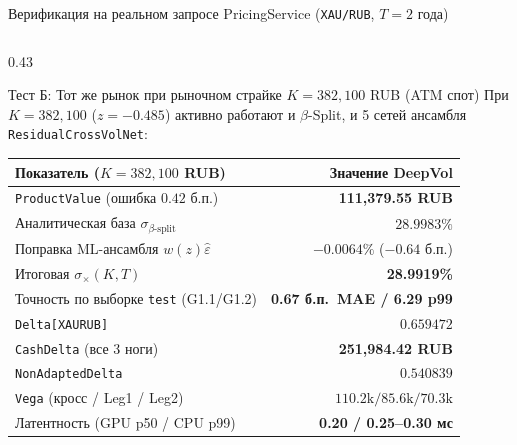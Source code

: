 \documentclass[aspectratio=169, 9pt]{beamer}
\begin{document}
\begin{frame}{Верификация на реальном запросе PricingService (\texttt{XAU/RUB}, $T = 2$ года)}
\begin{columns}[T]
    \begin{column}{0.43\textwidth}
      \begin{exampleblock}{Тест Б: Тот же рынок при рыночном страйке $K = 382,100$ RUB (ATM спот)}
        При $K = 382,100$ ($z = -0.485$) активно работают и $\beta$-Split, и 5 сетей ансамбля \texttt{ResidualCrossVolNet}:
        \vspace{0.2em}

        \scriptsize
        \renewcommand{\arraystretch}{1.15}
        \begin{tabular}{@{}lr@{}}
          \toprule
          \textbf{Показатель ($K = 382,100$ RUB)} & \textbf{Значение DeepVol} \\
          \midrule
          \texttt{ProductValue} (ошибка $0.42$ б.п.) & \textbf{111,379.55 RUB} \\
          Аналитическая база $\sigma_{\beta\text{-split}}$ & $28.9983\%$ \\
          Поправка ML-ансамбля $w(z)\hat{\varepsilon}$ & $-0.0064\%$ ($-0.64$ б.п.) \\
          Итоговая $\sigma_\times(K, T)$ & \textbf{28.9919\%} \\
          Точность по выборке \texttt{test} (G1.1/G1.2) & \textbf{0.67 б.п.\ MAE / 6.29 p99} \\
          \texttt{Delta[XAURUB]} & $0.659472$ \\
          \texttt{CashDelta} (все 3 ноги) & \textbf{251,984.42 RUB} \\
          \texttt{NonAdaptedDelta} & $0.540839$ \\
          \texttt{Vega} (кросс / Leg1 / Leg2) & $110.2\text{k} / 85.6\text{k} / 70.3\text{k}$ \\
          Латентность (GPU p50 / CPU p99) & \textbf{0.20 / 0.25--0.30 мс} \\
          \bottomrule
        \end{tabular}
      \end{exampleblock}
    \end{column}
  \end{columns}
\end{frame}
\end{document}

